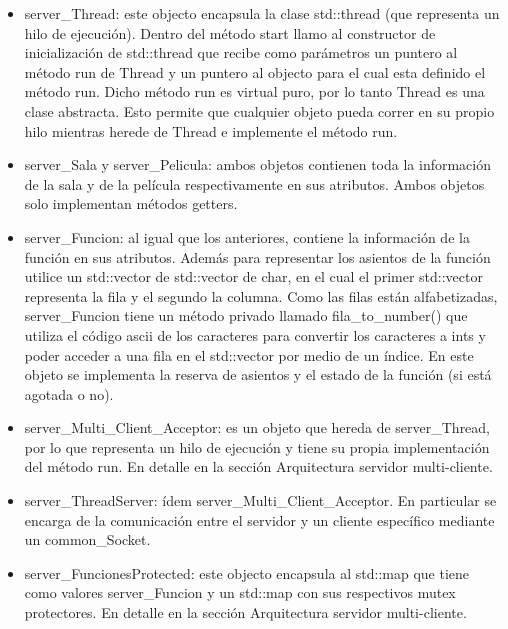 \documentclass[a4paper,12pt]{report}
\begin{document}
\begin{itemize}

\item server\_Thread: este objecto encapsula la clase std::thread (que representa un hilo de ejecuci\'on). Dentro del m\'etodo start llamo al constructor de inicializaci\'on de std::thread que recibe como par\'ametros un puntero al m\'etodo run de Thread y un puntero al objecto para el cual esta definido el m\'etodo run. Dicho m\'etodo run es virtual puro, por lo tanto Thread es una clase abstracta. Esto permite que cualquier objeto pueda correr en su propio hilo mientras herede de Thread e implemente el m\'etodo run.    

\item server\_Sala y server\_Pelicula: ambos objetos contienen toda la informaci\'on de la sala y de la pel\'icula respectivamente en sus atributos. Ambos objetos solo implementan m\'etodos getters.

\item server\_Funcion: al igual que los anteriores, contiene la informaci\'on de la funci\'on en sus atributos. Adem\'as para representar los asientos de la funci\'on utilice un std::vector de std::vector de char, en el cual el primer std::vector representa la fila y el segundo la columna. Como las filas est\'an alfabetizadas, server\_Funcion tiene un m\'etodo privado llamado fila\_to\_number() que utiliza el c\'odigo ascii de los caracteres para convertir los caracteres a ints y poder acceder a una fila en el std::vector por medio de un \'indice. En este objeto se implementa la reserva de asientos y el estado de la funci\'on (si est\'a agotada o no).

\item server\_Multi\_Client\_Acceptor: es un objeto que hereda de server\_Thread, por lo que representa un hilo de ejecuci\'on y tiene su propia implementaci\'on del m\'etodo run. En detalle en la secci\'on Arquitectura servidor multi-cliente.

\item server\_ThreadServer: \'idem server\_Multi\_Client\_Acceptor. En particular se encarga de la comunicaci\'on entre el servidor y un cliente espec\'ifico mediante un common\_Socket.

\item server\_FuncionesProtected: este objecto encapsula al std::map que tiene como valores server\_Funcion y un std::map con sus respectivos mutex protectores. En detalle en la secci\'on Arquitectura servidor multi-cliente.


\end{itemize}
\end{document}
